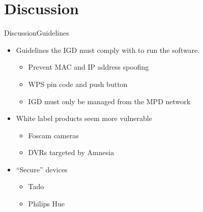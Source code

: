 \section{Discussion}

\begin{frame}{Discussion}{Guidelines}
\begin{itemize}
\item Guidelines the IGD must comply with to run the software.
	\begin{itemize}
		\item Prevent MAC and IP address spoofing
		\item WPS pin code and push button
		\item IGD must only be managed from the MPD network
	\end{itemize}
	\item White label products seem more vulnerable
	\begin{itemize}
		\item Foscam cameras
		\item DVRs targeted by Amnesia
	\end{itemize}
	\item ``Secure'' devices
	\begin{itemize}
		\item Tado
		\item Philips Hue
	\end{itemize}
\end{itemize}

\end{frame}

